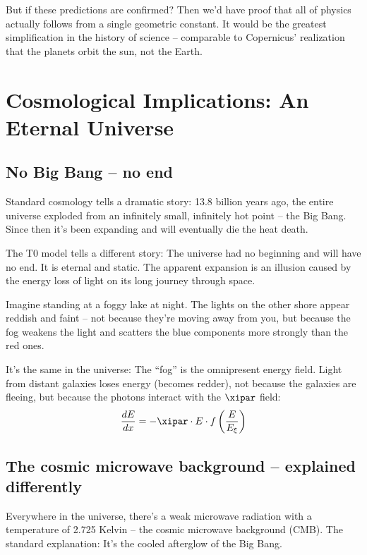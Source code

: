 	But if these predictions are confirmed? Then we'd have proof that all of physics actually follows from a single geometric constant. It would be the greatest simplification in the history of science -- comparable to Copernicus' realization that the planets orbit the sun, not the Earth.
	
	\section{Cosmological Implications: An Eternal Universe}
	
	\subsection{No Big Bang -- no end}
	
	Standard cosmology tells a dramatic story: 13.8 billion years ago, the entire universe exploded from an infinitely small, infinitely hot point -- the Big Bang. Since then it's been expanding and will eventually die the heat death.
	
	The T0 model tells a different story: The universe had no beginning and will have no end. It is eternal and static. The apparent expansion is an illusion caused by the energy loss of light on its long journey through space.
	
	\begin{revolutionary}
		Imagine standing at a foggy lake at night. The lights on the other shore appear reddish and faint -- not because they're moving away from you, but because the fog weakens the light and scatters the blue components more strongly than the red ones. 
		
		It's the same in the universe: The ``fog'' is the omnipresent energy field. Light from distant galaxies loses energy (becomes redder), not because the galaxies are fleeing, but because the photons interact with the $\xipar$ field:
		\begin{equation}
			\frac{dE}{dx} = -\xipar \cdot E \cdot f\left(\frac{E}{E_\xi}\right)
		\end{equation}
	\end{revolutionary}
	
	\subsection{The cosmic microwave background -- explained differently}
	
	Everywhere in the universe, there's a weak microwave radiation with a temperature of 2.725 Kelvin -- the cosmic microwave background (CMB). The standard explanation: It's the cooled afterglow of the Big Bang.
	

